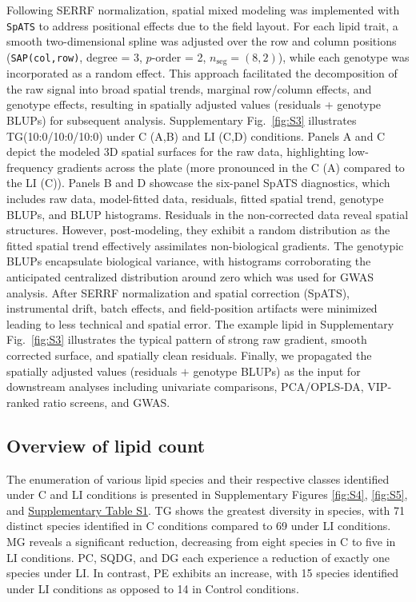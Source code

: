\documentclass[10pt,letterpaper]{article}
\begin{document}
Following SERRF normalization, spatial mixed modeling was implemented with \texttt{SpATS} to address positional effects due to the field layout. For each lipid trait, a smooth two-dimensional spline was adjusted over the row and column positions (\texttt{SAP(col,row)}, degree = 3, $p$-order = 2, $n_{\mathrm{seg}}=(8,2)$), while each genotype was incorporated as a random effect. This approach facilitated the decomposition of the raw signal into broad spatial trends, marginal row/column effects, and genotype effects, resulting in spatially adjusted values (residuals + genotype BLUPs) for subsequent analysis. Supplementary Fig.~\ref{fig:S3} illustrates TG(10:0/10:0/10:0) under C (A,B) and LI (C,D) conditions. Panels A and C depict the modeled 3D spatial surfaces for the raw data, highlighting low-frequency gradients across the plate (more pronounced in the C (A) compared to the LI (C)). Panels B and D showcase the six-panel SpATS diagnostics, which includes raw data, model-fitted data, residuals, fitted spatial trend, genotype BLUPs, and BLUP histograms. Residuals in the non-corrected data reveal spatial structures. However, post-modeling, they exhibit a random distribution as the fitted spatial trend effectively assimilates non-biological gradients. The genotypic BLUPs encapsulate biological variance, with histograms corroborating the anticipated centralized distribution around zero which was used for GWAS analysis. After SERRF normalization and spatial correction (SpATS), instrumental drift, batch effects, and field-position artifacts were minimized leading to less technical and spatial error. The example lipid in Supplementary Fig.~\ref{fig:S3} illustrates the typical pattern of strong raw gradient, smooth corrected surface, and spatially clean residuals. Finally, we propagated the spatially adjusted values (residuals $+$ genotype BLUPs) as the input for downstream analyses including univariate comparisons, PCA/OPLS‐DA, VIP‐ranked ratio screens, and GWAS. 

\subsection*{Overview of lipid count}
The enumeration of various lipid species and their respective classes identified under C and LI conditions is presented in Supplementary Figures \ref{fig:S4}, \ref{fig:S5}, and \href{https://docs.google.com/spreadsheets/d/1SB90-QLYheKEzmHCUIh1UfgkrtbL064s8Oo5BfwFaV0/edit?gid=0#gid=0}{Supplementary Table S1}. TG shows the greatest diversity in species, with 71 distinct species identified in C conditions compared to 69 under LI conditions. MG reveals a significant reduction, decreasing from eight species in C to five in LI conditions. PC, SQDG, and DG each experience a reduction of exactly one species under LI. In contrast, PE exhibits an increase, with 15 species identified under LI conditions as opposed to 14 in Control conditions.
\end{document}

